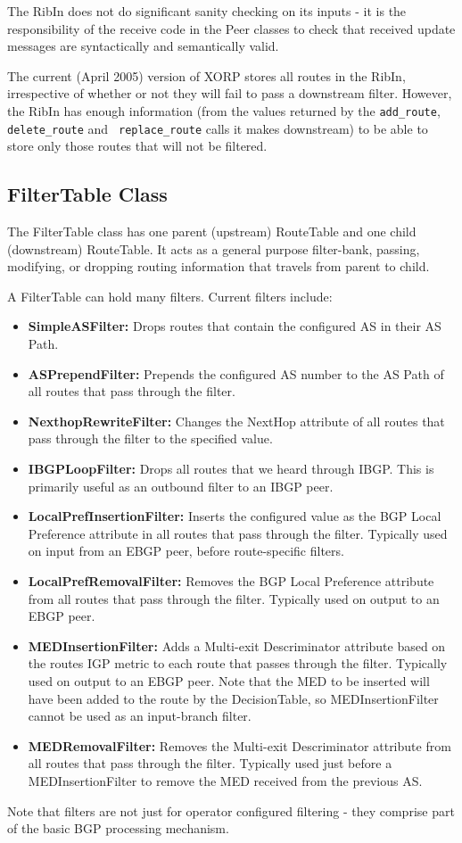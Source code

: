 \documentclass[11pt]{article}
\begin{document}
The RibIn does not do significant sanity checking on its inputs - it
is the responsibility of the receive code in the Peer classes to check
that received update messages are syntactically and semantically
valid.

The current (April 2005) version of XORP stores all routes in the RibIn,
irrespective of whether or not they will fail to pass a downstream
filter.  However, the RibIn has enough information (from the values
returned by the {\tt add\_route}, {\tt delete\_route} and {\tt
replace\_route} calls it makes downstream) to be able to store only
those routes that will not be filtered.

\subsection{FilterTable Class}

The FilterTable class has one parent (upstream) RouteTable and one
child (downstream) RouteTable.  It acts as a general purpose
filter-bank, passing, modifying, or dropping routing information that
travels from parent to child.

A FilterTable can hold many filters.  Current filters include:
\begin{itemize}
\item {\bf SimpleASFilter:}  Drops routes that contain the configured
AS in their AS Path.
\item {\bf ASPrependFilter:} Prepends the configured AS number to the
AS Path of all
routes that pass through the filter.
\item {\bf NexthopRewriteFilter:} Changes the NextHop attribute of all
routes that pass through the filter to the specified value.
\item {\bf IBGPLoopFilter:} Drops all routes that we heard through
IBGP.  This is primarily useful as an outbound filter to an IBGP peer.
\item {\bf LocalPrefInsertionFilter:} Inserts the configured value as
the BGP Local Preference attribute in all routes that pass through the
filter.  Typically used on input from an EBGP peer, before
route-specific filters.
\item {\bf LocalPrefRemovalFilter:} Removes the BGP Local Preference
attribute from all routes that pass through the filter.  Typically
used on output to an EBGP peer.
\item {\bf MEDInsertionFilter:} Adds a Multi-exit Descriminator
attribute based on the routes IGP metric to each route that passes
through the filter.  Typically used on output to an EBGP peer.  Note
that the MED to be inserted will have been added to the route by the
DecisionTable, so MEDInsertionFilter cannot be used as an input-branch
filter.
\item {\bf MEDRemovalFilter:} Removes the  Multi-exit Descriminator
attribute from all routes that pass through the filter.  Typically
used just before a MEDInsertionFilter to remove the MED received from
the previous AS.
\end{itemize}
Note that filters are not just for operator configured filtering -
they comprise part of the basic BGP processing mechanism.
\end{document}
